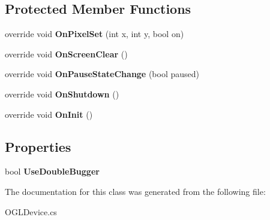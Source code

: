\subsection*{Protected Member Functions}
\begin{DoxyCompactItemize}
\item 
\hypertarget{class_eimu_1_1_devices_1_1_o_g_l_device_a7a2da9e0e230d6eaa12b13b32909552a}{
override void {\bfseries OnPixelSet} (int x, int y, bool on)}
\label{class_eimu_1_1_devices_1_1_o_g_l_device_a7a2da9e0e230d6eaa12b13b32909552a}

\item 
\hypertarget{class_eimu_1_1_devices_1_1_o_g_l_device_aef000f58bf8324964bcd01ccdf687884}{
override void {\bfseries OnScreenClear} ()}
\label{class_eimu_1_1_devices_1_1_o_g_l_device_aef000f58bf8324964bcd01ccdf687884}

\item 
\hypertarget{class_eimu_1_1_devices_1_1_o_g_l_device_a510009fa0e1ef73969ffbb3fa4cc9537}{
override void {\bfseries OnPauseStateChange} (bool paused)}
\label{class_eimu_1_1_devices_1_1_o_g_l_device_a510009fa0e1ef73969ffbb3fa4cc9537}

\item 
\hypertarget{class_eimu_1_1_devices_1_1_o_g_l_device_ab5f9ed65baaf584f55f7fc14fffcf699}{
override void {\bfseries OnShutdown} ()}
\label{class_eimu_1_1_devices_1_1_o_g_l_device_ab5f9ed65baaf584f55f7fc14fffcf699}

\item 
\hypertarget{class_eimu_1_1_devices_1_1_o_g_l_device_a6eb5830ec5ed8bf1cf98fbe5afc1364a}{
override void {\bfseries OnInit} ()}
\label{class_eimu_1_1_devices_1_1_o_g_l_device_a6eb5830ec5ed8bf1cf98fbe5afc1364a}

\end{DoxyCompactItemize}
\subsection*{Properties}
\begin{DoxyCompactItemize}
\item 
\hypertarget{class_eimu_1_1_devices_1_1_o_g_l_device_a790a40da04196d96ad0682189f979aa1}{
bool {\bfseries UseDoubleBugger}}
\label{class_eimu_1_1_devices_1_1_o_g_l_device_a790a40da04196d96ad0682189f979aa1}

\end{DoxyCompactItemize}


The documentation for this class was generated from the following file:\begin{DoxyCompactItemize}
\item 
OGLDevice.cs\end{DoxyCompactItemize}
